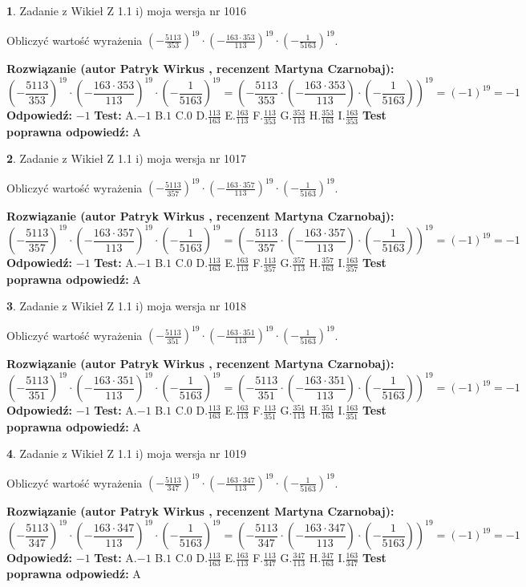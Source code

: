 \documentclass[12pt, a4paper]{article}
\theoremstyle{definition} %
\newtheorem{zad}{}
\newcommand{\zadStart}[1]{\begin{zad}#1\newline}
\newcommand{\zadStop}{\end{zad}}
\newcommand{\rozwStart}[2]{\noindent \textbf{Rozwiązanie (autor #1 , recenzent #2): }\newline}
\newcommand{\rozwStop}{\newline}
\newcommand{\odpStart}{\noindent \textbf{Odpowiedź:}\newline}
\newcommand{\odpStop}{\newline}
\newcommand{\testStart}{\noindent \textbf{Test:}\newline}
\newcommand{\testStop}{\newline}
\newcommand{\kluczStart}{\noindent \textbf{Test poprawna odpowiedź:}\newline}
\newcommand{\kluczStop}{\newline}
\begin{document}
\zadStart{Zadanie z Wikieł Z 1.1 i) moja wersja nr 1016}

Obliczyć wartość wyrażenia $(-\frac{5113}{353})^{19} \cdot (-\frac{163 \cdot 353}{113})^{19} \cdot (-\frac{1}{5163})^{19}$.
\zadStop
\rozwStart{Patryk Wirkus}{Martyna Czarnobaj}
$$(-\frac{5113}{353})^{19} \cdot (-\frac{163 \cdot 353}{113})^{19} \cdot (-\frac{1}{5163})^{19} = (-\frac{5113}{353} \cdot (-\frac{163 \cdot 353}{113}) \cdot (-\frac{1}{5163}))^{19} = (-1)^{19} = -1$$
\rozwStop
\odpStart
$-1$
\odpStop
\testStart
A.$-1$ B.$1$ C.$0$ D.$\frac{113}{163}$ E.$\frac{163}{113}$
F.$\frac{113}{353}$ G.$\frac{353}{113}$
H.$\frac{353}{163}$
I.$\frac{163}{353}$
\testStop
\kluczStart
A
\kluczStop



\zadStart{Zadanie z Wikieł Z 1.1 i) moja wersja nr 1017}

Obliczyć wartość wyrażenia $(-\frac{5113}{357})^{19} \cdot (-\frac{163 \cdot 357}{113})^{19} \cdot (-\frac{1}{5163})^{19}$.
\zadStop
\rozwStart{Patryk Wirkus}{Martyna Czarnobaj}
$$(-\frac{5113}{357})^{19} \cdot (-\frac{163 \cdot 357}{113})^{19} \cdot (-\frac{1}{5163})^{19} = (-\frac{5113}{357} \cdot (-\frac{163 \cdot 357}{113}) \cdot (-\frac{1}{5163}))^{19} = (-1)^{19} = -1$$
\rozwStop
\odpStart
$-1$
\odpStop
\testStart
A.$-1$ B.$1$ C.$0$ D.$\frac{113}{163}$ E.$\frac{163}{113}$
F.$\frac{113}{357}$ G.$\frac{357}{113}$
H.$\frac{357}{163}$
I.$\frac{163}{357}$
\testStop
\kluczStart
A
\kluczStop



\zadStart{Zadanie z Wikieł Z 1.1 i) moja wersja nr 1018}

Obliczyć wartość wyrażenia $(-\frac{5113}{351})^{19} \cdot (-\frac{163 \cdot 351}{113})^{19} \cdot (-\frac{1}{5163})^{19}$.
\zadStop
\rozwStart{Patryk Wirkus}{Martyna Czarnobaj}
$$(-\frac{5113}{351})^{19} \cdot (-\frac{163 \cdot 351}{113})^{19} \cdot (-\frac{1}{5163})^{19} = (-\frac{5113}{351} \cdot (-\frac{163 \cdot 351}{113}) \cdot (-\frac{1}{5163}))^{19} = (-1)^{19} = -1$$
\rozwStop
\odpStart
$-1$
\odpStop
\testStart
A.$-1$ B.$1$ C.$0$ D.$\frac{113}{163}$ E.$\frac{163}{113}$
F.$\frac{113}{351}$ G.$\frac{351}{113}$
H.$\frac{351}{163}$
I.$\frac{163}{351}$
\testStop
\kluczStart
A
\kluczStop



\zadStart{Zadanie z Wikieł Z 1.1 i) moja wersja nr 1019}

Obliczyć wartość wyrażenia $(-\frac{5113}{347})^{19} \cdot (-\frac{163 \cdot 347}{113})^{19} \cdot (-\frac{1}{5163})^{19}$.
\zadStop
\rozwStart{Patryk Wirkus}{Martyna Czarnobaj}
$$(-\frac{5113}{347})^{19} \cdot (-\frac{163 \cdot 347}{113})^{19} \cdot (-\frac{1}{5163})^{19} = (-\frac{5113}{347} \cdot (-\frac{163 \cdot 347}{113}) \cdot (-\frac{1}{5163}))^{19} = (-1)^{19} = -1$$
\rozwStop
\odpStart
$-1$
\odpStop
\testStart
A.$-1$ B.$1$ C.$0$ D.$\frac{113}{163}$ E.$\frac{163}{113}$
F.$\frac{113}{347}$ G.$\frac{347}{113}$
H.$\frac{347}{163}$
I.$\frac{163}{347}$
\testStop
\kluczStart
A
\kluczStop
\end{document}
